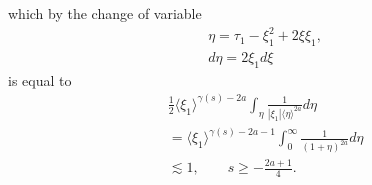 \documentclass[12pt,reqno]{amsart}
\numberwithin{equation}{section}  %
\begin{document}
%
which by the change of variable
%
%
\begin{equation*}
\begin{split}
  & \eta = \tau_{1} - \xi_{1}^{2} + 2 \xi \xi_{1},
  \\
  & d \eta = 2 \xi_{1} d \xi
\end{split}
\end{equation*}
%
%
is equal to
%
%
\begin{equation*}
\begin{split}
  & \frac{1}{2} \langle \xi_{1} \rangle ^{\gamma(s)-2a}  \int_{\eta} 
  \frac{1}{| \xi_{1} |\langle \eta \rangle ^{2a} }d \eta
  \\
  & = \langle \xi_{1} \rangle ^{\gamma(s)-2a-1} \int_{0}^{\infty} \frac{1}{(1 + \eta
  )^{2a}}d \eta
  \\
  & \lesssim 1, \qquad s \ge -\frac{2a+1}{4}.
\end{split}
\end{equation*}
%
%
\end{document}

